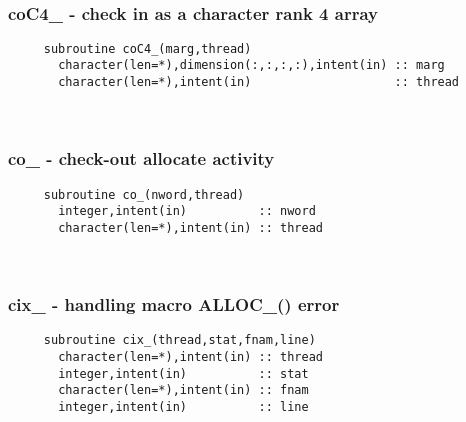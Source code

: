  
\mbox{}\hrulefill\ 
 
  \subsubsection{coC4\_ - check in as a character rank 4 array}

\begin{verbatim} 
     subroutine coC4_(marg,thread)
       character(len=*),dimension(:,:,:,:),intent(in) :: marg
       character(len=*),intent(in)                    :: thread
 \end{verbatim}%
 
 
\mbox{}\hrulefill\ 
 
  \subsubsection{co\_ - check-out allocate activity}

\begin{verbatim} 
     subroutine co_(nword,thread)
       integer,intent(in)          :: nword
       character(len=*),intent(in) :: thread
 \end{verbatim}%
 
 
\mbox{}\hrulefill\ 
 
  \subsubsection{cix\_ - handling macro ALLOC\_() error}

\begin{verbatim} 
     subroutine cix_(thread,stat,fnam,line)
       character(len=*),intent(in) :: thread
       integer,intent(in)          :: stat
       character(len=*),intent(in) :: fnam
       integer,intent(in)          :: line
 
 \end{verbatim}%
 
